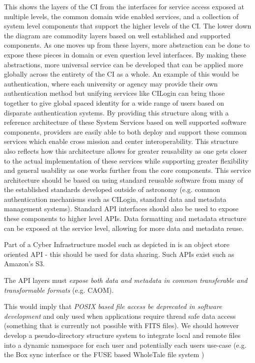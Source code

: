  This shows the
layers of the \gls{CI} from the interfaces for service access exposed
at multiple levels, the common domain wide enabled services, and a collection of system level components that support the
higher levels of the \gls{CI}.
The lower down the diagram are commodity layers based on well established and supported
components. As one moves up from these layers, more abstraction can be done to
expose these pieces in domain or even question level interfaces. By making these
abstractions, more universal service can be developed that can be applied more globally
across the entirety of the \gls{CI} as a whole.  An example of this would be
authentication, where each university or agency may provide their own authentication method
but unifying services like CILogin can bring those together to give global spaced
identity for a wide range of users based on disparate authentication systems.
By providing this structure along with a reference architecture of these System Services based on
well supported software components, providers are easily able to both deploy and support these common services which enable
cross mission and center interoperability. This structure also reflects how this architecture allows for greater reusability as one gets closer to the actual implementation of these
services while supporting greater flexibility and general usability as one works further from the core components.
This service architecture should be based on using standard reusable software from many of the established standards developed outside of astronomy (e.g. common authentication mechanisms such as CILogin, standard data and \gls{metadata} management systems).  Standard \gls{API} interfaces should also be used to expose these components to higher level \gls{API}s. Data
formatting and \gls{metadata} structure can be exposed at the service level, allowing for
more data and \gls{metadata} reuse.


Part of a Cyber Infrastructure model such as depicted in  is an object store oriented API - this should be used for data sharing. Such APIs exist such as Amazon's S3.

The  \gls{API} layers must \emph{expose both data and \gls{metadata} in common
transferable and transformable formats} (e.g. \gls{CAOM}).

This would imply that \emph{POSIX based file access be deprecated
in software development} and only used when applications require thread safe
data access (something that is currently not possible with \gls{FITS} files).
We should however  develop a pseudo-directory structure system to
integrate local and remote files into a dynamic namespace for each user and potentially
each users use-case (e.g. the Box sync interface or the \gls{FUSE} based WholeTale file system
\citep{BRINCKMAN2019854})


